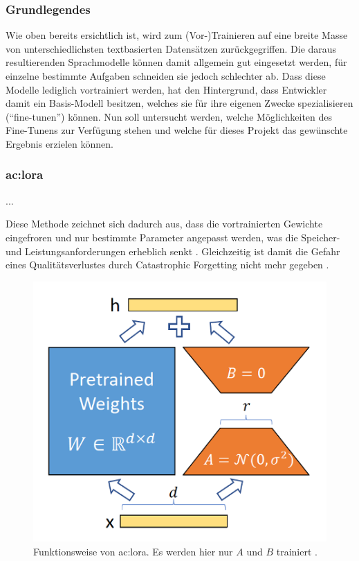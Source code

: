\subsubsection{Grundlegendes}

Wie oben bereits ersichtlich ist, wird zum (Vor-)Trainieren auf eine breite Masse von unterschiedlichsten textbasierten Datensätzen zurückgegriffen. Die daraus resultierenden Sprachmodelle können damit allgemein gut eingesetzt werden, für einzelne bestimmte Aufgaben schneiden sie jedoch schlechter ab. Dass diese Modelle lediglich vortrainiert werden, hat den Hintergrund, dass Entwickler damit ein Basis-Modell besitzen, welches sie für ihre eigenen Zwecke spezialisieren (\enquote{fine-tunen}) können. Nun soll untersucht werden, welche Möglichkeiten des Fine-Tunens zur Verfügung stehen und welche für dieses Projekt das gewünschte Ergebnis erzielen können.

\subsubsection{\acrfull{ac:lora}}\label{sec:lora}

...

\smallskip\par\noindent
Diese Methode zeichnet sich dadurch aus, dass die vortrainierten Gewichte eingefroren und nur bestimmte Parameter angepasst werden, was die Speicher- und Leistungsanforderungen erheblich senkt \cite[1]{Hu2021}. Gleichzeitig ist damit die Gefahr eines Qualitätsverlustes durch \gls{Catastrophic Forgetting} nicht mehr gegeben \cite{HugFaceLoRa}.

\begin{figure}
    \centering
    \includegraphics[scale=0.4]{images/asuender/lora.png}
    \caption{Funktionsweise von \acrshort{ac:lora}. Es werden hier nur $A$ und $B$ trainiert \cite[1]{Hu2021}.}
    \label{fig:lora}
\end{figure}

